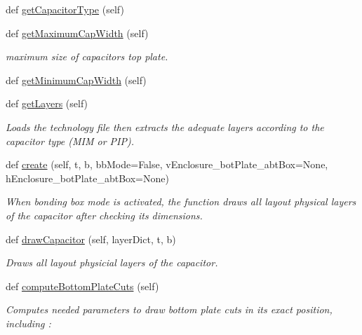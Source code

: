 \begin{DoxyCompactItemize}
def \mbox{\hyperlink{classpython_1_1capacitorunit_1_1CapacitorUnit_a826bc534525cb9da119bf5e53393c4e8}{get\+Capacitor\+Type}} (self)
\item 
def \mbox{\hyperlink{classpython_1_1capacitorunit_1_1CapacitorUnit_a11bb732ab03e3d6b3fb8b4e3b109c983}{get\+Maximum\+Cap\+Width}} (self)
\begin{DoxyCompactList}\small\item\em maximum size of capacitor\textquotesingle{}s top plate. \end{DoxyCompactList}\item 
def \mbox{\hyperlink{classpython_1_1capacitorunit_1_1CapacitorUnit_ad2f46584dd8249360127259f6c563921}{get\+Minimum\+Cap\+Width}} (self)
\item 
def \mbox{\hyperlink{classpython_1_1capacitorunit_1_1CapacitorUnit_a2f1c438575964c1db979c40b9db805c7}{get\+Layers}} (self)
\begin{DoxyCompactList}\small\item\em Loads the technology file then extracts the adequate layers according to the capacitor type (M\+IM or P\+IP). \end{DoxyCompactList}\item 
def \mbox{\hyperlink{classpython_1_1capacitorunit_1_1CapacitorUnit_acd7ed0a77e223a638c85d07aed261b9f}{create}} (self, t, b, bb\+Mode=False, v\+Enclosure\+\_\+bot\+Plate\+\_\+abt\+Box=None, h\+Enclosure\+\_\+bot\+Plate\+\_\+abt\+Box=None)
\begin{DoxyCompactList}\small\item\em When bonding box mode is activated, the function draws all layout physical layers of the capacitor after checking its dimensions. \end{DoxyCompactList}\item 
def \mbox{\hyperlink{classpython_1_1capacitorunit_1_1CapacitorUnit_aeef7d302c356dc7036c732e114bb1616}{draw\+Capacitor}} (self, layer\+Dict, t, b)
\begin{DoxyCompactList}\small\item\em Draws all layout physicial layers of the capacitor. \end{DoxyCompactList}\item 
def \mbox{\hyperlink{classpython_1_1capacitorunit_1_1CapacitorUnit_addb554b11e23dd09df70724d5f72c740}{compute\+Bottom\+Plate\+Cuts}} (self)
\begin{DoxyCompactList}\small\item\em Computes needed parameters to draw bottom plate cuts in its exact position, including \+: \end{DoxyCompactList}\item 

\end{DoxyCompactItemize}
